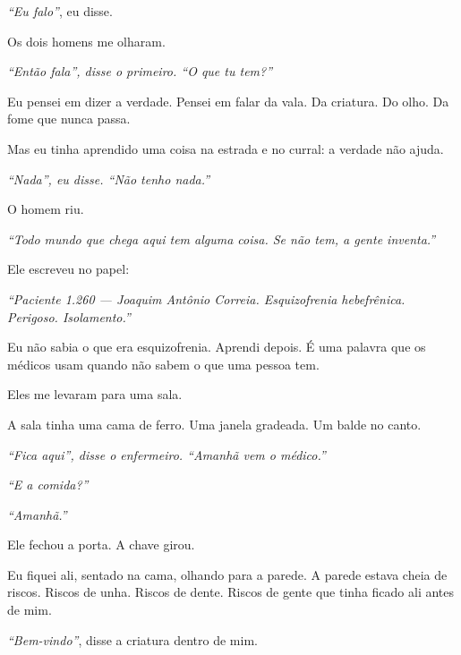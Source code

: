 \noindent \textit{\textquotedblleft{}Eu falo\textquotedblright{}}, eu disse.

\noindent Os dois homens me olharam.

\noindent \textit{\textquotedblleft{}Então fala\textquotedblright{}\textit{, disse o primeiro. }\textquotedblleft{}O que tu tem?\textquotedblright{}}

\noindent Eu pensei em dizer a verdade. Pensei em falar da vala. Da criatura. Do olho. Da fome que nunca passa.

\noindent Mas eu tinha aprendido uma coisa na estrada e no curral: a verdade não ajuda.

\noindent \textit{\textquotedblleft{}Nada\textquotedblright{}\textit{, eu disse. }\textquotedblleft{}Não tenho nada.\textquotedblright{}}

\noindent O homem riu.

\noindent \textit{\textquotedblleft{}Todo mundo que chega aqui tem alguma coisa. Se não tem, a gente inventa.\textquotedblright{}}

\noindent Ele escreveu no papel:

\noindent \textit{\textquotedblleft{}Paciente 1.260 --- Joaquim Antônio Correia. Esquizofrenia hebefrênica. Perigoso. Isolamento.\textquotedblright{}}

\noindent Eu não sabia o que era esquizofrenia. Aprendi depois. É uma palavra que os médicos usam quando não sabem o que uma pessoa tem.

\noindent Eles me levaram para uma sala.

\noindent A sala tinha uma cama de ferro. Uma janela gradeada. Um balde no canto.

\noindent \textit{\textquotedblleft{}Fica aqui\textquotedblright{}\textit{, disse o enfermeiro. }\textquotedblleft{}Amanhã vem o médico.\textquotedblright{}}

\noindent \textit{\textquotedblleft{}E a comida?\textquotedblright{}}

\noindent \textit{\textquotedblleft{}Amanhã.\textquotedblright{}}

\noindent Ele fechou a porta. A chave girou.

\noindent Eu fiquei ali, sentado na cama, olhando para a parede. A parede estava cheia de riscos. Riscos de unha. Riscos de dente. Riscos de gente que tinha ficado ali antes de mim.

\noindent \textit{\textquotedblleft{}Bem-vindo\textquotedblright{}}, disse a criatura dentro de mim.

